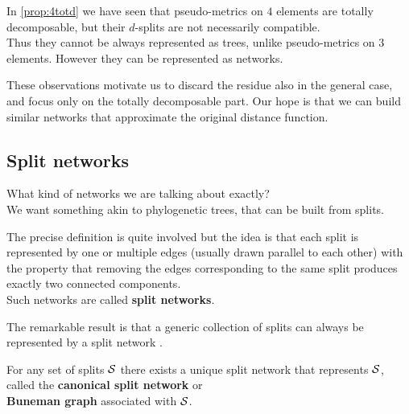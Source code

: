 \documentclass[./main.tex]{subfiles}
\begin{document}
In \autoref{prop:4totd} we have seen that pseudo-metrics on $4$ elements are totally decomposable, but their $d$-splits are not necessarily compatible. \\
Thus they cannot be always represented as trees, unlike pseudo-metrics on $3$ elements. However they can be represented as networks.

\begin{figure}[h]
    \centering
\end{figure}

\clearpage

These observations motivate us to discard the residue also in the general case, and focus only on the totally decomposable part. Our hope is that we can build similar networks that approximate the original distance function.



\subsection*{Split networks}

What kind of networks we are talking about exactly? \\
We want something akin to phylogenetic trees, that can be built from splits.

The precise definition is quite involved but the idea is that each split is represented by one or multiple edges (usually drawn parallel to each other) with the property that removing the edges corresponding to the same split produces exactly two connected components. \\
Such networks are called \textbf{split networks}.\footnotemark

\begin{figure}[h]
    \centering
\end{figure}


The remarkable result is that a generic collection of splits can always be represented by a split network \cites[§5.6]{HRS11}.
\begin{remarklike}[Fact]
    For any set of splits ${\mathcal{S}}$ there exists a unique split network that represents ${\mathcal{S}}$, called the \textbf{canonical split network} or \\
    \bsp \textbf{Buneman graph} associated with ${\mathcal{S}}$.
\end{remarklike}
\end{document}
